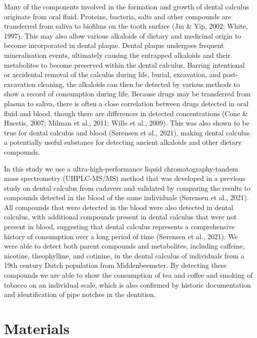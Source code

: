 \documentclass[
]{article}
\begin{document}
Many of the components involved in the formation and growth of dental
calculus originate from oral fluid. Proteins, bacteria, salts and other
compounds are transferred from saliva to biofilms on the tooth surface
(Jin \& Yip, 2002; White, 1997). This may also allow various alkaloids
of dietary and medicinal origin to become incorporated in dental plaque.
Dental plaque undergoes frequent mineralisation events, ultimately
causing the entrapped alkaloids and their metabolites to become
preserved within the dental calculus. Barring intentional or accidental
removal of the calculus during life, burial, excavation, and
post-excavation cleaning, the alkaloids can then be detected by various
methods to show a record of consumption during life. Because drugs may
be transferred from plasma to saliva, there is often a close correlation
between drugs detected in oral fluid and blood, though there are
differences in detected concentrations (Cone \& Huestis, 2007; Milman et
al., 2011; Wille et al., 2009). This was also shown to be true for
dental calculus and blood (Sørensen et al., 2021), making dental
calculus a potentially useful substance for detecting ancient alkaloids
and other dietary compounds.

In this study we use a ultra-high-performance liquid
chromatography-tandem mass spectrometry (UHPLC-MS/MS) method that was
developed in a previous study on dental calculus from cadavers and
validated by comparing the results to compounds detected in the blood of
the same individuals (Sørensen et al., 2021). All compounds that were
detected in the blood were also detected in dental calculus, with
additional compounds present in dental calculus that were not present in
blood, suggesting that dental calculus represents a comprehensive
history of consumption over a long period of time (Sørensen et al.,
2021). We were able to detect both parent compounds and metabolites,
including caffeine, nicotine, theophylline, and cotinine, in the dental
calculus of individuals from a 19th century Dutch population from
Middenbeemster. By detecting these compounds we are able to show the
consumption of tea and coffee and smoking of tobacco on an individual
scale, which is also confirmed by historic documentation and
identification of pipe notches in the dentition.

\section{Materials}\label{materials}
\end{document}

